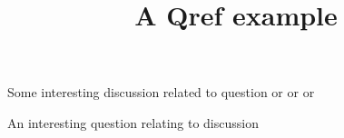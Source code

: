 \documentclass[hidesidemenu]{webquiz}
\title{A Qref example}
\begin{document}
  \begin{discussion}\label{d:one}
    Some interesting discussion related to question  or 
    or  or 
  \end{discussion}
  \begin{question}\label{q:one}
     An interesting question relating to discussion 
  \end{question}
\end{document}

